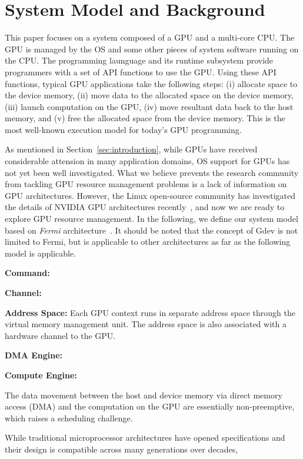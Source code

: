 \section{System Model and Background}
\label{sec:model}

This paper focuses on a system composed of a GPU and a multi-core CPU.
The GPU is managed by the OS and some other pieces of system software
running on the CPU.
The programming launguage and its runtime subsystem provide programmers
with a set of API functions to use the GPU.
Using these API functions, typical GPU applications take the following
steps: (i) allocate space to the device memory, (ii) move data to the
allocated space on the device memory, (iii) launch computation on the
GPU, (iv) move resultant data back to the host memory, and (v) free the
allocated space from the device memory.
This is the most well-known execution model for today's GPU
programming.

As mentioned in Section~\ref{sec:introduction}, while GPUs have received
considerable attension in many application domains, OS support for GPUs
has not yet been well investigated.
What we believe prevents the research community from tackling GPU
resource management problems is a lack of information on GPU
architectures.
However, the Linux open-source community has investigated the details
of NVIDIA GPU architectures recently~\cite{envytools}, and now we are
ready to explore GPU resource management.
In the following, we define our system model based on \textit{Fermi}
architecture~\cite{Fermi}.
It should be noted that the concept of Gdev is not limited to Fermi, but
is applicable to other architectures as far as the following model is
applicable.

\textbf{Command:}


\textbf{Channel:}


\textbf{Address Space:}
Each GPU context runs in separate address space through the virtual
memory management unit.
The address space is also associated with a hardware channel to the GPU.

\textbf{DMA Engine:}

\textbf{Compute Engine:}

The data movement between the host and device memory via direct memory
access (DMA) and the computation on the GPU are essentially
non-preemptive, which raises a scheduling challenge.

While traditional microprocessor architectures have opened
specifications and their design is compatible across many generations
over decades, 


